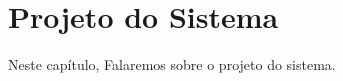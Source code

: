 
\begin{comment}
    Prof. Dr. Ausberto S. Castro Vera
    UENF - CCT - LCMAT - Curso de Ciência da Computação
    Campos, RJ,  2022
    Disciplina: Análise e Projeto de Sistemas
    Aluno: João Vítor Fernandes Dias
\end{comment}

\chapter{Projeto do Sistema}
    Neste capítulo, Falaremos sobre o projeto do sistema.